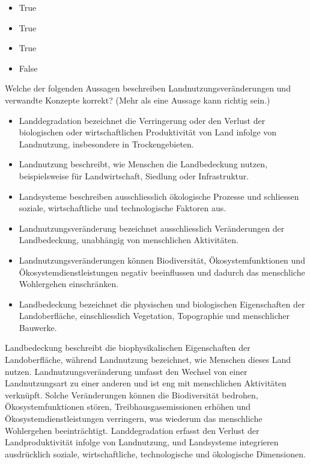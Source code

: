 \documentclass[
  nswissgerman,
  a4paper,
  openany]{book}
\providecommand{\tightlist}{%
  \setlength{\itemsep}{0pt}\setlength{\parskip}{0pt}}
\begin{document}
\begin{itemize}
\tightlist
\item
  True
\item
  True
\item
  True
\item
  False
\end{itemize}

Welche der folgenden Aussagen beschreiben Landnutzungsveränderungen und
verwandte Konzepte korrekt? (Mehr als eine Aussage kann richtig sein.)

\begin{itemize}
\tightlist
\item[$\square$]
  Landdegradation bezeichnet die Verringerung oder den Verlust der
  biologischen oder wirtschaftlichen Produktivität von Land infolge von
  Landnutzung, insbesondere in Trockengebieten.
\item[$\square$]
  Landnutzung beschreibt, wie Menschen die Landbedeckung nutzen,
  beispielsweise für Landwirtschaft, Siedlung oder Infrastruktur.
\item[$\square$]
  Landsysteme beschreiben ausschliesslich ökologische Prozesse und
  schliessen soziale, wirtschaftliche und technologische Faktoren aus.
\item[$\square$]
  Landnutzungsveränderung bezeichnet ausschliesslich Veränderungen der
  Landbedeckung, unabhängig von menschlichen Aktivitäten.
\item[$\square$]
  Landnutzungsveränderungen können Biodiversität, Ökosystemfunktionen
  und Ökosystemdienstleistungen negativ beeinflussen und dadurch das
  menschliche Wohlergehen einschränken.
\item[$\square$]
  Landbedeckung bezeichnet die physischen und biologischen Eigenschaften
  der Landoberfläche, einschliesslich Vegetation, Topographie und
  menschlicher Bauwerke.
\end{itemize}

Landbedeckung beschreibt die biophysikalischen Eigenschaften der
Landoberfläche, während Landnutzung bezeichnet, wie Menschen dieses Land
nutzen. Landnutzungsveränderung umfasst den Wechsel von einer
Landnutzungsart zu einer anderen und ist eng mit menschlichen
Aktivitäten verknüpft. Solche Veränderungen können die Biodiversität
bedrohen, Ökosystemfunktionen stören, Treibhausgasemissionen erhöhen und
Ökosystemdienstleistungen verringern, was wiederum das menschliche
Wohlergehen beeinträchtigt. Landdegradation erfasst den Verlust der
Landproduktivität infolge von Landnutzung, und Landsysteme integrieren
ausdrücklich soziale, wirtschaftliche, technologische und ökologische
Dimensionen.
\end{document}
